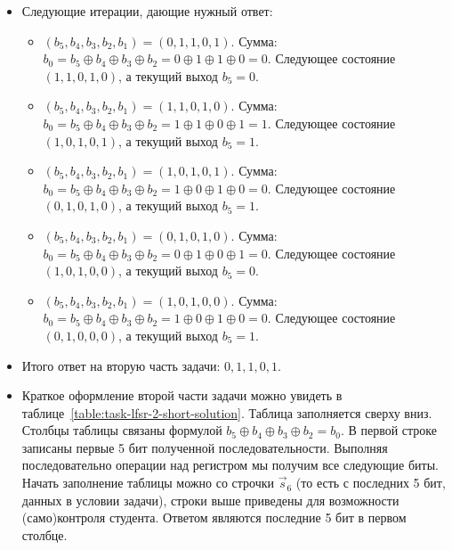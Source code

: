 \begin{itemize}
\begin{itemize}
	\end{itemize}
	\item Следующие итерации, дающие нужный ответ:
	\begin{itemize}\itemsep1pt \parskip0pt 
		\item $\left(b_{5},b_{4},b_{3},b_{2},b_{1}\right) = \left(0,1,1,0,1\right)$. Сумма: $b_0 = b_{5} \oplus b_{4} \oplus b_{3} \oplus b_{2}=0 \oplus 1 \oplus 1 \oplus 0=0$. Следующее состояние $\left(1,1,0,1,0\right)$, а текущий выход $b_{5}=0$.
		\item $\left(b_{5},b_{4},b_{3},b_{2},b_{1}\right) = \left(1,1,0,1,0\right)$. Сумма: $b_0 = b_{5} \oplus b_{4} \oplus b_{3} \oplus b_{2}=1 \oplus 1 \oplus 0 \oplus 1=1$. Следующее состояние $\left(1,0,1,0,1\right)$, а текущий выход $b_{5}=1$.
		\item $\left(b_{5},b_{4},b_{3},b_{2},b_{1}\right) = \left(1,0,1,0,1\right)$. Сумма: $b_0 = b_{5} \oplus b_{4} \oplus b_{3} \oplus b_{2}=1 \oplus 0 \oplus 1 \oplus 0=0$. Следующее состояние $\left(0,1,0,1,0\right)$, а текущий выход $b_{5}=1$.
		\item $\left(b_{5},b_{4},b_{3},b_{2},b_{1}\right) = \left(0,1,0,1,0\right)$. Сумма: $b_0 = b_{5} \oplus b_{4} \oplus b_{3} \oplus b_{2}=0 \oplus 1 \oplus 0 \oplus 1=0$. Следующее состояние $\left(1,0,1,0,0\right)$, а текущий выход $b_{5}=0$.
		\item $\left(b_{5},b_{4},b_{3},b_{2},b_{1}\right) = \left(1,0,1,0,0\right)$. Сумма: $b_0 = b_{5} \oplus b_{4} \oplus b_{3} \oplus b_{2}=1 \oplus 0 \oplus 1 \oplus 0=0$. Следующее состояние $\left(0,1,0,0,0\right)$, а текущий выход $b_{5}=1$.
		\end{itemize}
	\item Итого ответ на вторую часть задачи: $0,1,1,0,1$.
	\item Краткое оформление второй части задачи можно увидеть в таблице~\ref{table:task-lfsr-2-short-solution}. Таблица заполняется сверху вниз. Столбцы таблицы связаны формулой $b_{5} \oplus b_{4} \oplus b_{3} \oplus b_{2} = b_0 $. В первой строке записаны первые 5 бит полученной последовательности. Выполняя последовательно операции над регистром мы получим все следующие биты. Начать заполнение таблицы можно со строчки $\overrightarrow s_{6}$ (то есть с последних 5 бит, данных в условии задачи), строки выше приведены для возможности (само)контроля студента. Ответом являются последние 5 бит в первом столбце.
	\begin{table}[!thb]
		\centering
		\begin{tabular}{ l | c || c c c c c|| c }

\end{tabular}
\end{table}
\end{itemize}
